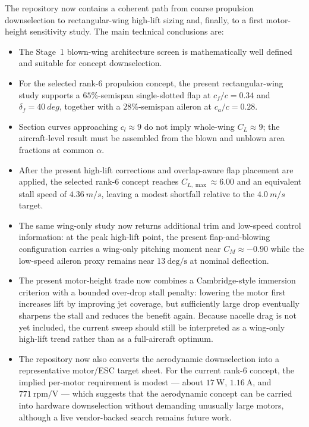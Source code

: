 \documentclass[conf]{new-aiaa}
\begin{document}
The repository now contains a coherent path from coarse propulsion downselection to rectangular-wing high-lift sizing and, finally, to a first motor-height sensitivity study. The main technical conclusions are:
\begin{itemize}
\item The Stage~1 blown-wing architecture screen is mathematically well defined and suitable for concept downselection.
\item For the selected rank-6 propulsion concept, the present rectangular-wing study supports a \(65\%\)-semispan single-slotted flap at \(c_f/c=0.34\) and \(\delta_f=\SI{40}{deg}\), together with a \(28\%\)-semispan aileron at \(c_a/c=0.28\).
\item Section curves approaching \(c_l\approx 9\) do not imply whole-wing \(C_L\approx 9\); the aircraft-level result must be assembled from the blown and unblown area fractions at common \(\alpha\).
\item After the present high-lift corrections and overlap-aware flap placement are applied, the selected rank-6 concept reaches \(C_{L,\max}\approx 6.00\) and an equivalent stall speed of \(\SI{4.36}{m/s}\), leaving a modest shortfall relative to the \(\SI{4.0}{m/s}\) target.
\item The same wing-only study now returns additional trim and low-speed control information: at the peak high-lift point, the present flap-and-blowing configuration carries a wing-only pitching moment near \(C_M\approx -0.90\) while the low-speed aileron proxy remains near \(13\ \mathrm{deg/s}\) at nominal deflection.
\item The present motor-height trade now combines a Cambridge-style immersion criterion with a bounded over-drop stall penalty: lowering the motor first increases lift by improving jet coverage, but sufficiently large drop eventually sharpens the stall and reduces the benefit again. Because nacelle drag is not yet included, the current sweep should still be interpreted as a wing-only high-lift trend rather than as a full-aircraft optimum.
\item The repository now also converts the aerodynamic downselection into a representative motor/ESC target sheet. For the current rank-6 concept, the implied per-motor requirement is modest --- about \(17\ \mathrm{W}\), \(1.16\ \mathrm{A}\), and \(771\ \mathrm{rpm/V}\) --- which suggests that the aerodynamic concept can be carried into hardware downselection without demanding unusually large motors, although a live vendor-backed search remains future work.
\end{itemize}
\end{document}
